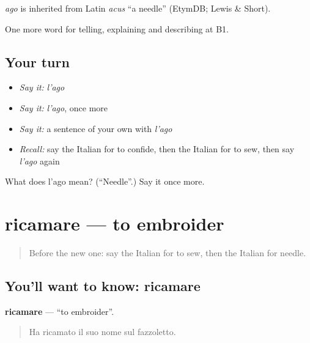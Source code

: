 \begin{cousinweb}
\emph{ago} is inherited from Latin \emph{acus} \textquotedblleft{}a needle\textquotedblright{} (EtymDB; Lewis \& Short).
\end{cousinweb}

\begin{grammarlens}[title={What you've built}]
One more word for telling, explaining and describing at B1.
\end{grammarlens}

\subsection*{Your turn}
\begin{itemize}
\raggedright
  \item \emph{Say it:} \emph{l'ago}
  \item \emph{Say it:} \emph{l'ago}, once more
  \item \emph{Say it:} a sentence of your own with \emph{l'ago}
  \item \emph{Recall:} say the Italian for to confide, then the Italian for to sew, then say \emph{l'ago} again
\end{itemize}

\begin{tcolorbox}[breakable,colback=teal!4,colframe=teal!35!black,title={Before you move on}]
What does l'ago mean? (\textquotedblleft{}Needle\textquotedblright{}.) Say it once more.
\end{tcolorbox}
\section[ricamare]{ricamare — to embroider}

\label{lesson:IT-C500-ricamare}



\begin{quote}
Before the new one: say the Italian for to sew, then the Italian for needle.
\end{quote}

\subsection*{You'll want to know: ricamare}
\textbf{ricamare} — \textquotedblleft{}to embroider\textquotedblright{}.

\begin{quote}
Ha ricamato il suo nome sul fazzoletto.
\end{quote}

